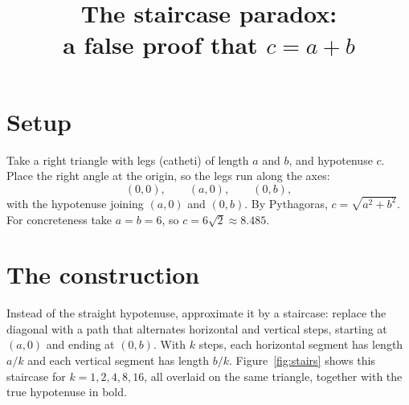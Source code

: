 \documentclass[11pt]{article}
\title{The staircase paradox:\\ a false proof that $c = a+b$}
\author{}
\date{}
\begin{document}
\maketitle

\section{Setup}

Take a right triangle with legs (catheti) of length $a$ and $b$, and hypotenuse
$c$. Place the right angle at the origin, so the legs run along the axes:
$$(0,0),\qquad (a,0),\qquad (0,b),$$
with the hypotenuse joining $(a,0)$ and $(0,b)$. By Pythagoras,
$c=\sqrt{a^2+b^2}$. For concreteness take $a=b=6$, so $c = 6\sqrt2 \approx 8.485$.

\section{The construction}

Instead of the straight hypotenuse, approximate it by a staircase: replace the
diagonal with a path that alternates horizontal and vertical steps, starting
at $(a,0)$ and ending at $(0,b)$. With $k$ steps, each horizontal segment has
length $a/k$ and each vertical segment has length $b/k$. Figure~\ref{fig:stairs}
shows this staircase for $k = 1,2,4,8,16$, all overlaid on the same triangle,
together with the true hypotenuse in bold.
\end{document}
